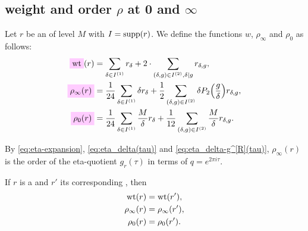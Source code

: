 \documentclass{article}
\begin{document}
\subsection{weight and order $\rho$ at 0 and $\infty$}

Let $r$ be an  of level $M$ with
$I=\operatorname{supp}(r)$. We define the functions $w$, $\rho_\infty$ and
$\rho_0$ as follows:
\begin{align}
  \defineNotation[wgt]{\weight}(r)
  &=
    \sum_{\delta\in I^{(1)}} r_\delta
    +
    2 \cdot\sum_{(\delta,g)\in I^{(2)}, \divides{\delta}{g}} r_{\delta,g},
  \\
  \defineNotation[rhoinfty(r)]{\rho_\infty(r)}
  &=
    \frac{1}{24} \sum_{\delta\in I^{(1)}} \delta r_\delta
    +
    \frac{1}{2}
    \sum_{(\delta,g)\in I^{(2)}}\delta P_2\Bigl(\frac{g}{\delta}\Bigr)r_{\delta,g},
    \label{eq:rhoinfty}
  \\
  \defineNotation[rhozero(r)]{\rho_0(r)}
  &=
    \frac{1}{24} \sum_{\delta\in I^{(1)}} \frac{M}{\delta} r_\delta
    +
    \frac{1}{12} \sum_{(\delta,g)\in I^{(2)}} \frac{M}{\delta} r_{\delta,g}.
    \label{eq:rhozero}
\end{align}

By \eqref{eq:eta-expansion}, \eqref{eq:eta_delta(tau)} and
\eqref{eq:eta_delta-g^[R](tau)}, $\rho_\infty(r)$ is the order of the
eta-quotient $g_r(\tau)$ in terms of $q=e^{2\pi i \tau}$.

\begin{Lemma}\label{thm:purified-rho-computation}
  If $r$ is a  and $r'$ its corresponding
  , then
  \begin{align*}
    \operatorname{wt}(r) &= \operatorname{wt}(r'),
    \\
    \rho_\infty(r) &= \rho_\infty(r'),
    \\
    \rho_0(r) &= \rho_0(r').
  \end{align*}
\end{Lemma}
\end{document}
